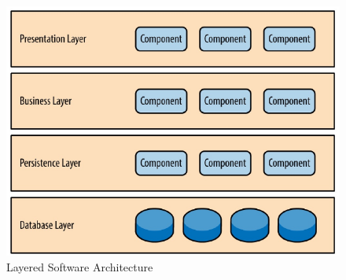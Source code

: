 \documentclass[conference]{IEEEtran}
\begin{document}
\begin{figure}[b!]
	\includegraphics[width=\columnwidth]{images/LayeredArchitecture}	
	\caption{Layered Software Architecture}
	\label{fig:LayeredArchitecture}
\end{figure}
\end{document}
